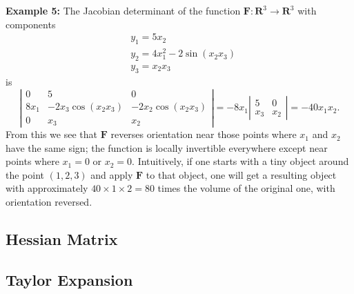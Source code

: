\documentclass[14pt]{article}
\theoremstyle{definition}
\theoremstyle{remark}
\begin{document}
\textbf{Example 5:}
The Jacobian determinant of the function $\mathbf{F}: \mathbf{R}^3 \rightarrow \mathbf{R}^3$ with components
$$
    \begin{aligned}
         & y_1=5 x_2                               \\
         & y_2=4 x_1^2-2 \sin \left(x_2 x_3\right) \\
         & y_3=x_2 x_3
    \end{aligned}
$$
is
$$
    \left|\begin{array}{ccc}
        0     & 5                                & 0                                \\
        8 x_1 & -2 x_3 \cos \left(x_2 x_3\right) & -2 x_2 \cos \left(x_2 x_3\right) \\
        0     & x_3                              & x_2
    \end{array}\right|=-8 x_1\left|\begin{array}{cc}
        5   & 0   \\
        x_3 & x_2
    \end{array}\right|=-40 x_1 x_2 .
$$
From this we see that $\mathbf{F}$ reverses orientation near those points where $x_1$ and $x_2$ have the same sign; the function is locally invertible everywhere except near points where $x_1=0$ or $x_2=0$. Intuitively, if one starts with a tiny object around the point $(1,2,3)$ and apply $\mathbf{F}$ to that object, one will get a resulting object with approximately $40 \times 1 \times 2=80$ times the volume of the original one, with orientation reversed.







\subsection{Hessian Matrix}

\subsection{Taylor Expansion}


\newpage
\end{document}
